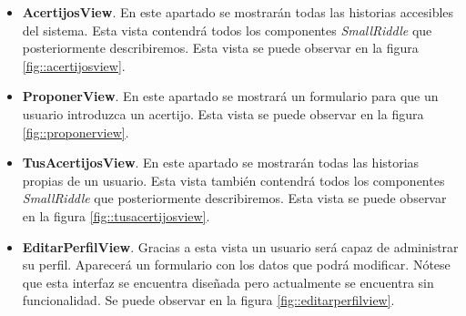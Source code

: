 \begin{itemize}
    \item \textbf{AcertijosView}. En este apartado se mostrarán todas las historias accesibles del sistema. Esta vista contendrá todos los componentes \textit{SmallRiddle} que posteriormente describiremos. Esta vista se puede observar en la figura \ref{fig::acertijosview}.
    \item \textbf{ProponerView}. En este apartado se mostrará un formulario para que un usuario introduzca un acertijo. Esta vista se puede observar en la figura \ref{fig::proponerview}.
    \item \textbf{TusAcertijosView}. En este apartado se mostrarán todas las historias propias de un usuario. Esta vista también contendrá todos los componentes \textit{SmallRiddle} que posteriormente describiremos. Esta vista se puede observar en la figura \ref{fig::tusacertijosview}.
    \item \textbf{EditarPerfilView}. Gracias a esta vista un usuario será capaz de administrar su perfil. Aparecerá un formulario con los datos que podrá modificar. Nótese que esta interfaz se encuentra diseñada pero actualmente se encuentra sin funcionalidad. Se puede observar en la figura \ref{fig::editarperfilview}.
\end{itemize}

